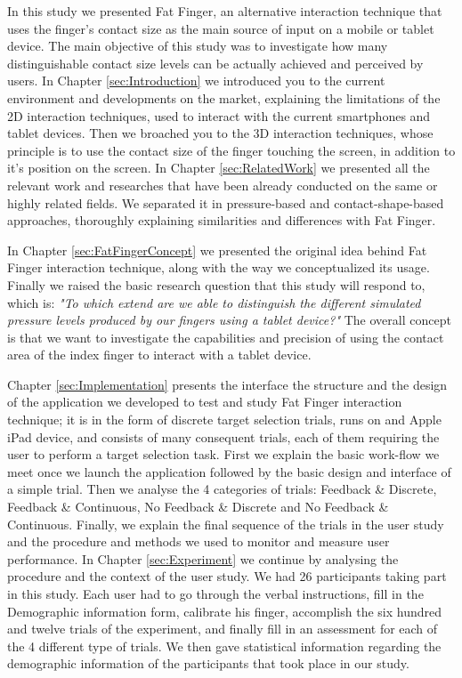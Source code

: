 

In this study we presented Fat Finger, an alternative interaction technique that uses the finger's contact size as the main source of input on a mobile or tablet device. The main objective of this study was to investigate how many distinguishable contact size levels can be actually achieved and perceived by users. 
In Chapter \ref{sec:Introduction} we introduced you to the current environment and developments on the market, explaining the limitations of the 2D interaction techniques, used to interact with the current smartphones and tablet devices. 
Then we broached you to the 3D interaction techniques, whose principle is to use the contact size of the finger touching the screen, in addition to it's position on the screen. In Chapter \ref{sec:RelatedWork} we presented all the relevant work and researches that have been already conducted on the same or highly related fields. We separated it in pressure-based and contact-shape-based approaches, thoroughly explaining similarities and differences with Fat Finger. 

In Chapter \ref{sec:FatFingerConcept} we presented the original idea behind Fat Finger interaction technique, along with the way we conceptualized its usage. Finally we raised the basic research question that this study will respond to, which is:
 \emph{"To which extend are we able to distinguish the different simulated pressure levels produced by our fingers using a tablet device?"}
The overall concept is that we want to investigate the capabilities and precision of using the contact area of the index finger  to interact with a tablet device. 

Chapter \ref{sec:Implementation} presents the interface the structure and the design of the application we developed to test and study Fat Finger interaction technique; it is in the form of discrete target selection trials, runs on and Apple iPad device, and consists of many consequent trials, each of them requiring the user to perform a target selection task.
First we explain the basic work-flow  we meet once we launch the application followed by the basic design and interface of a simple trial. Then we analyse the 4 categories of trials: Feedback \& Discrete, Feedback \& Continuous, No Feedback \& Discrete and  No Feedback \& Continuous. Finally, we explain the final sequence of the trials in the user study and the procedure and methods we used to monitor and measure user performance.
In Chapter \ref{sec:Experiment} we continue by analysing the procedure and the context of the user study. We had 26 participants taking part in this study.  Each user had to go through the verbal instructions, fill in the Demographic information form, calibrate his finger, accomplish the six hundred and twelve trials of the experiment, and finally fill in an assessment for each of the 4 different type of trials. We then gave statistical information regarding the demographic information of the participants that took place in our study. 

